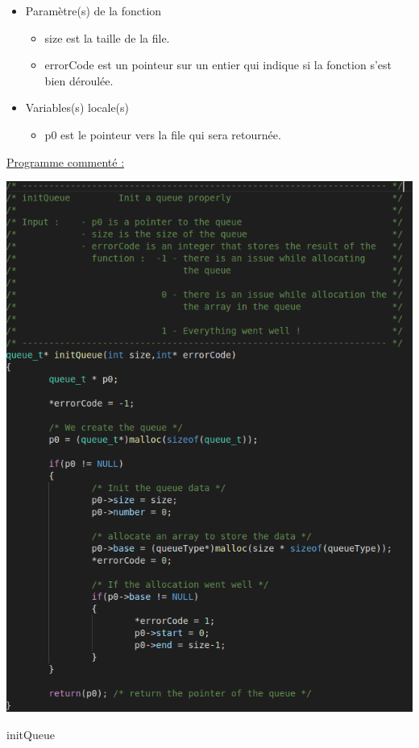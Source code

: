 \documentclass[a4paper]{article}
\begin{document}
\begin{itemize}

\item Paramètre(s) de la fonction  

\begin{itemize}

\item size est la taille de la file.

\item errorCode est un pointeur sur un entier qui indique si la fonction s'est bien déroulée.
\end{itemize}
\item Variables(s) locale(s)  

\begin{itemize}

\item p0 est le pointeur vers la file qui sera retournée.

\end{itemize}
\end{itemize}
\underline{Programme commenté :}
\begin{center}
\includegraphics[scale=0.4]{initQueue.png}

initQueue
\end{center}
\end{document}
